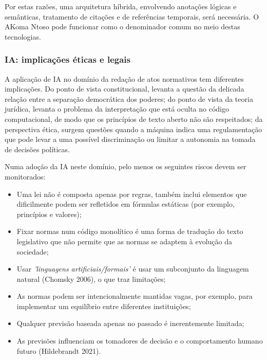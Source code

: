 Por estas razões, uma arquitetura híbrida, envolvendo anotações lógicas e semânticas, tratamento de citações e de referências 
temporais, será necessária. O AKoma Ntoso pode funcionar como o denominador comum no meio destas tecnologias.


\subsubsection{IA: implicações éticas e legais}

A aplicação de IA no domínio da redação de atos normativos tem diferentes implicações. 
Do ponto de vista constitucional, levanta a questão da delicada relação entre a separação democrática dos poderes; 
do ponto de vista da teoria jurídica, levanta o problema da interpretação que está oculta no código computacional, 
de modo que os princípios de texto aberto não são respeitados; da perspectiva ética, surgem questões quando a máquina 
indica uma regulamentação que pode levar a uma possível discriminação ou limitar a autonomia na tomada de decisões políticas.

Numa adoção da IA neste domínio, pelo menos os seguintes riscos devem ser monitorados:

\begin{itemize}

    \item Uma lei não é composta apenas por regras, também inclui elementos que dificilmente podem ser refletidos em fórmulas 
    estáticas (por exemplo, princípios e valores);

    \item Fixar normas num código monolítico é uma forma de tradução do texto legislativo que não permite que as normas se 
    adaptem à evolução da sociedade;

    \item Usar \emph{'linguagens artificiais/formais'} é usar um subconjunto da linguagem natural (Chomsky 2006), 
    o que traz limitações;
    
    \item As normas podem ser intencionalmente mantidas vagas, por exemplo, para implementar um equilíbrio entre diferentes 
    instituições;

    \item Qualquer previsão baseada apenas no passado é inerentemente limitada;
    \item As previsões influenciam os tomadores de decisão e o comportamento humano futuro (Hildebrandt 2021).

\end{itemize}

